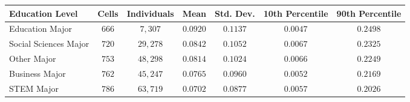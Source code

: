 \begin{tabular}{lcccccc}
\toprule
Education Level&Cells&Individuals&Mean&Std. Dev.&10th Percentile&90th Percentile\tabularnewline
\midrule
Education Major&$666$&$ 7,307$&$0.0920$&$0.1137$&$0.0047$&$0.2498$\tabularnewline
Social Sciences Major&$720$&$29,278$&$0.0842$&$0.1052$&$0.0067$&$0.2325$\tabularnewline
Other Major&$753$&$48,298$&$0.0814$&$0.1024$&$0.0066$&$0.2249$\tabularnewline
Business Major&$762$&$45,247$&$0.0765$&$0.0960$&$0.0052$&$0.2169$\tabularnewline
STEM Major&$786$&$63,719$&$0.0702$&$0.0877$&$0.0057$&$0.2026$\tabularnewline
\bottomrule
\end{tabular}
